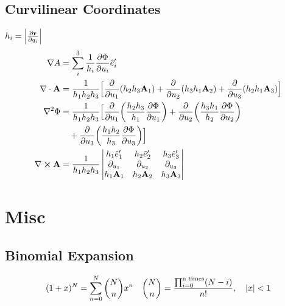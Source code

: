 \documentclass[8pt]{extarticle}
\newcommand{\A}{{\mathbf{A}}}
\begin{document}
\begin{multicols*}{3}
\subsection{Curvilinear Coordinates}
$h_i = \abs{\pdv{\vectorbold{r}}{q_i}}$
\begin{align*}
    \nabla A &= \sum_i^3 \frac{1}{h_i}\pdv{\Phi}{u_i}\hat{e}_i^\prime \\
    \nabla \cdot \A &= \frac{1}{h_1 h_2 h_3}\Big[\pdv{u_1}(h_2 h_3 \A_1)
    + \pdv{u_2}(h_3 h_1 \A_2) + \pdv{u_3}(h_2 h_1 \A_3)\Big] \\
    \nabla^2\Phi &= \frac{1}{h_1 h_2 h_3} \Big[
        \pdv{u_1}(\frac{h_2 h_3}{h_1} \pdv{\Phi}{u_1})
        + \pdv{u_2}(\frac{h_3 h_1}{h_2} \pdv{\Phi}{u_2}) \\
        &\quad + \pdv{u_3}(\frac{h_1 h_2}{h_3} \pdv{\Phi}{u_3}) \Big] \\
    \nabla \cross \A &= \frac{1}{h_1 h_2 h_3}
    \begin{vmatrix}
        h_1 \hat{e}_1^\prime & h_2 \hat{e}_2^\prime & h_3 \hat{e}_3^\prime \\
        \partial_{u_1} & \partial_{u_2} & \partial_{u_3} \\
        h_1\A_1 & h_2\A_2 & h_3\A_3
    \end{vmatrix}
\end{align*}

\section{Misc}
\subsection{Binomial Expansion}
\begin{equation*}
    (1+x)^N = \sum_{n=0}^N \binom{N}{n}x^n \quad \binom{N}{n} =
    \frac{\prod_{i=0}^{\text{n times}}(N-i)}{n!} ,\quad \abs{x}<1
\end{equation*}


\end{multicols*}
\end{document}
